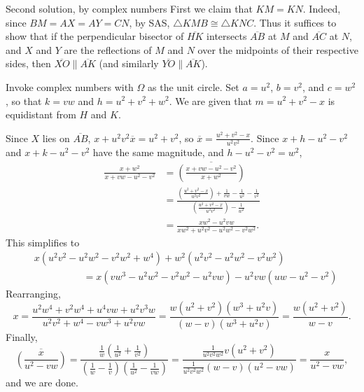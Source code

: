 \newpage
\begin{customenv}{Second solution, by complex numbers}
    First we claim that $KM=KN$. Indeed, since $BM=AX=AY=CN$, by SAS, $\triangle KMB\cong\triangle KNC$. Thus it suffices to show that if the perpendicular bisector of $\overline{HK}$ intersects $\overline{AB}$ at $M$ and $\overline{AC}$ at $N$, and $X$ and $Y$ are the reflections of $M$ and $N$ over the midpoints of their respective sides, then $\overline{XO}\parallel\overline{AK}$ (and similarly $\overline{YO}\parallel\overline{AK}$).

    Invoke complex numbers with $\Omega$ as the unit circle. Set $a=u^2$, $b=v^2$, and $c=w^2$, so that $k=vw$ and $h=u^2+v^2+w^2$. We are given that $m=u^2+v^2-x$ is equidistant from $H$ and $K$.

    Since $X$ lies on $\overline{AB}$, $x+u^2v^2\overline x=u^2+v^2$, so $\overline x=\tfrac{u^2+v^2-x}{u^2v^2}$. Since $x+h-u^2-v^2$ and $x+k-u^2-v^2$ have the same magnitude, and $h-u^2-v^2=w^2$,
    \begin{align*}
        \frac{x+w^2}{x+vw-u^2-v^2}&=\overline{\left(\frac{x+vw-u^2-v^2}{x+w^2}\right)}\\
        &=\frac{\left(\frac{u^2+v^2-x}{u^2v^2}\right)+\frac1{vw}-\frac1{u^2}-\frac1{v^2}}{\left(\frac{u^2+v^2-x}{u^2v^2}\right)-\frac1{w^2}}\\
        &=\frac{xw^2-u^2vw}{xw^2+u^2v^2-u^2w^2-v^2w^2}.
    \end{align*}
    This simplifies to
    \begin{align*}
        &x(u^2v^2-u^2w^2-v^2w^2+w^4)+w^2(u^2v^2-u^2w^2-v^2w^2)\\
        &\hspace{5em}=x(vw^3-u^2w^2-v^2w^2-u^2vw)-u^2vw(uw-u^2-v^2)
    \end{align*}
    Rearranging, \[x=\frac{u^2w^4+v^2w^4+u^4vw+u^2v^3w}{u^2v^2+w^4-vw^3+u^2vw}=\frac{w(u^2+v^2)(w^3+u^2v)}{(w-v)(w^3+u^2v)}=\frac{w(u^2+v^2)}{w-v}.\]
    Finally, \[\overline{\left(\frac x{u^2-vw}\right)}=\frac{\tfrac1w\left(\frac1{u^2}+\frac1{v^2}\right)}{\left(\frac1w-\frac1v\right)\left(\frac1{u^2}-\frac1{vw}\right)}=\frac{\frac1{u^2v^2w^2}v\left(u^2+v^2\right)}{\frac1{u^2v^2w^2}(w-v)(u^2-vw)}=\frac x{u^2-vw},\]
    and we are done.
\end{customenv}


